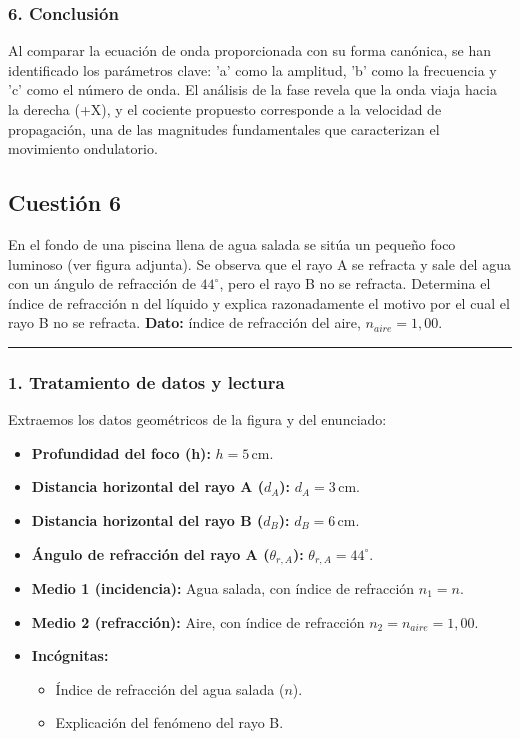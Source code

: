 \subsubsection*{6. Conclusión}
\begin{cajaconclusion}
Al comparar la ecuación de onda proporcionada con su forma canónica, se han identificado los parámetros clave: 'a' como la amplitud, 'b' como la frecuencia y 'c' como el número de onda. El análisis de la fase revela que la onda viaja hacia la derecha (+X), y el cociente propuesto corresponde a la velocidad de propagación, una de las magnitudes fundamentales que caracterizan el movimiento ondulatorio.
\end{cajaconclusion}

\newpage

\subsection{Cuestión 6}
\label{subsec:C6_2022_jul_ord}

\begin{cajaenunciado}
En el fondo de una piscina llena de agua salada se sitúa un pequeño foco luminoso (ver figura adjunta). Se observa que el rayo A se refracta y sale del agua con un ángulo de refracción de $44^{\circ}$, pero el rayo B no se refracta. Determina el índice de refracción n del líquido y explica razonadamente el motivo por el cual el rayo B no se refracta.
\textbf{Dato:} índice de refracción del aire, $n_{aire}=1,00$.
\end{cajaenunciado}
\hrule

\subsubsection*{1. Tratamiento de datos y lectura}
Extraemos los datos geométricos de la figura y del enunciado:
\begin{itemize}
    \item \textbf{Profundidad del foco (h):} $h = 5\,\text{cm}$.
    \item \textbf{Distancia horizontal del rayo A ($d_A$):} $d_A = 3\,\text{cm}$.
    \item \textbf{Distancia horizontal del rayo B ($d_B$):} $d_B = 6\,\text{cm}$.
    \item \textbf{Ángulo de refracción del rayo A ($\theta_{r,A}$):} $\theta_{r,A} = 44^{\circ}$.
    \item \textbf{Medio 1 (incidencia):} Agua salada, con índice de refracción $n_1 = n$.
    \item \textbf{Medio 2 (refracción):} Aire, con índice de refracción $n_2 = n_{aire} = 1,00$.
    \item \textbf{Incógnitas:}
    \begin{itemize}
        \item Índice de refracción del agua salada ($n$).
        \item Explicación del fenómeno del rayo B.
    \end{itemize}
\end{itemize}

